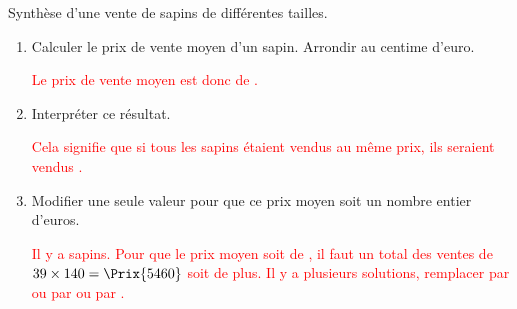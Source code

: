 \begin{corrige}
    Synthèse d'une vente de sapins de différentes tailles.
    \par\smallskip
    \smallskip
    \begin{enumerate}
        \item Calculer le prix de vente moyen d'un sapin. Arrondir au centime d'euro.
        \par\smallskip
        \textcolor{red}{
            Le prix de vente moyen est donc de .
        }
        \smallskip        
        \item Interpréter ce résultat.
        \par\smallskip
        \textcolor{red}{Cela signifie que si tous les sapins étaient vendus au même prix, ils seraient vendus .}
        \item Modifier une seule valeur pour que ce prix moyen soit un nombre entier d'euros.
        \par\smallskip
        \textcolor{red}{
            Il y a \EffectifTotal sapins. Pour que le prix moyen soit de , il faut un total des ventes de $39\times 140=\Prix{5460}$
            soit  de plus. Il y a plusieurs solutions, remplacer  par  ou  par  ou  par .
        }
    \end{enumerate}
\end{corrige}


